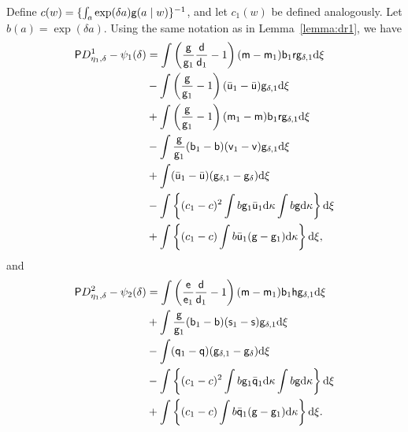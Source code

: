 \begin{lemma}\label{lemma:so2}
  Define $c(w) = \{\int_a \exp(\delta a)\mathsf{g}(a\mid w)\}^{-1}$, and let
  $c_1(w)$ be defined analogously. Let $b(a) = \exp(\delta a)$. Using
  the same notation as in Lemma~\ref{lemma:dr1}, we have
  \begin{align*}
    \mathsf{P} D_{\eta_1,\delta}^1  -\psi_1(\delta)
    & =
      \int\left(\frac{\mathsf{g}}{\mathsf{g}_1}\frac{\mathsf{d}}{\mathsf{d}_1} -
      1\right)(\mathsf{m}-\mathsf{m}_1)\mathsf{b}_1\mathsf{r}\mathsf{g}_{\delta,1}\mathrm{d}\xi\\
    &-\int\left(\frac{\mathsf{g}}{\mathsf{g}_1}-1\right)(\bar{\mathsf{u}}_1-\bar{\mathsf{u}})\mathsf{g}_{\delta,1}\mathrm{d}\xi\\
    &+\int\left(\frac{\mathsf{g}}{\mathsf{g}_1}-1\right)(\mathsf{m}_1-\mathsf{m})\mathsf{b}_1\mathsf{r}\mathsf{g}_{\delta,1}\mathrm{d}\xi\\
    &-\int\frac{\mathsf{g}}{\mathsf{g}_1}(\mathsf{b}_1-\mathsf{b})(\mathsf{v}_1-\mathsf{v})\mathsf{g}_{\delta,1}\mathrm{d}\xi\\
    &+ \int(\bar{\mathsf{u}}_1-\bar{\mathsf{u}})(\mathsf{g}_{\delta,1}-\mathsf{g}_\delta)\mathrm{d}\xi\\
    & -\int\left\{(c_1-c)^2\int b
      \mathsf{g}_1\bar{\mathsf{u}}_1\mathrm{d}\kappa\int b
      \mathsf{g}\mathrm{d}\kappa\right\}\mathrm{d}\xi\\
    &+\int \left\{(c_1-c)\int b\bar{\mathsf{u}}_1(\mathsf{g}-\mathsf{g}_1)\mathrm{d}\kappa\right\}\mathrm{d}\xi,
  \end{align*}
  and
  \begin{align*}
    \mathsf{P} D_{\eta_1,\delta}^2  -\psi_2(\delta)
    & = \int\left(\frac{\mathsf{e}}{\mathsf{e}_1}\frac{\mathsf{d}}{\mathsf{d}_1}  -
      1\right)(\mathsf{m}-\mathsf{m}_1)\mathsf{b}_1\mathsf{h}\mathsf{g}_{\delta,1} \mathrm{d}\xi\\
    &+\int\frac{\mathsf{g}}{\mathsf{g}_1}(\mathsf{b}_1-\mathsf{b})(\mathsf{s}_1-\mathsf{s})\mathsf{g}_{\delta,1}\mathrm{d}\xi\\
    &-\int(\mathsf{q}_1-\mathsf{q})(\mathsf{g}_{\delta,1}-\mathsf{g}_\delta)\mathrm{d}\xi\\
    & -\int\left\{(c_1-c)^2\int b
      \mathsf{g}_1\bar{\mathsf{q}}_1\mathrm{d}\kappa\int b
      \mathsf{g}\mathrm{d}\kappa\right\}\mathrm{d}\xi\\
    &+\int \left\{(c_1-c)\int b\bar{\mathsf{q}}_1(\mathsf{g}-\mathsf{g}_1)\mathrm{d}\kappa\right\}\mathrm{d}\xi.
  \end{align*}

\end{lemma}

